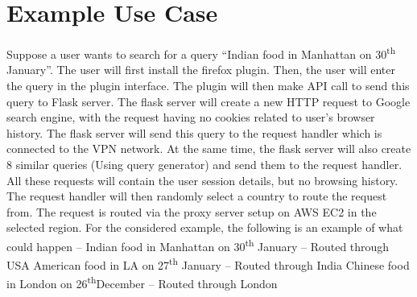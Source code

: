 \documentclass[10pt, a4paper, twocolumn]{article} %
\begin{document}
\section{Example Use Case}
Suppose a user wants to search for a query “Indian food in Manhattan on 30\textsuperscript{th} January”. The user will first install the firefox plugin. Then, the user will enter the query in the plugin interface. The plugin will then make API call to send this query to Flask server. The flask server will create a new HTTP request to Google search engine, with the request having no cookies related to user’s browser history. The flask server will send this query to the request handler which is connected to the VPN network. At the same time, the flask server will also create 8 similar queries (Using query generator) and send them to the request handler. All these requests will contain the user session details, but no browsing history. The request handler will then randomly select a country to route the request from. The request is routed via the proxy server setup on AWS EC2 in the selected region. For the considered example, the following is an example of what could happen – \newline
Indian food in Manhattan on 30\textsuperscript{th} January – Routed through USA\newline
American food in LA on 27\textsuperscript{th} January – Routed through India\newline
Chinese food in London on 26\textsuperscript{th}December – Routed through London
\end{document}
